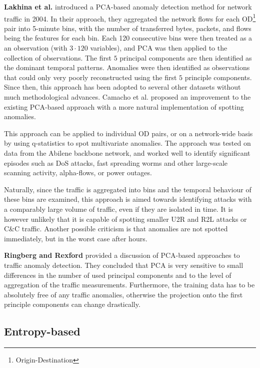 \documentclass[a4paper,12pt,twoside]{report}
\begin{document}
\textbf{Lakhina et al.} \cite{lakhina_diagnosing_2004,lakhina_characterization_2004}  introduced a PCA-based anomaly detection method for network traffic in 2004. In their approach, they aggregated the network flows for each OD\footnote{Origin-Destination} pair into 5-minute bins, with the number of transferred bytes, packets, and flows being the features for each bin. Each 120 consecutive bins were then treated as a an observation (with $3\cdot 120$ variables), and PCA was then applied to the collection of observations. The first $5$ principal components are then identified as the dominant temporal patterns. Anomalies were then identified as observations that could only very poorly reconstructed using the first $5$ principle components. Since then, this approach has been adopted to several other datasets without much methodological advances. Camacho et al. \cite{camacho_pca-based_2016} proposed an improvement to the existing PCA-based approach with a more natural implementation of spotting anomalies. 

This approach can be applied to individual OD pairs, or on a network-wide basis by using q-statistics to spot multivariate anomalies. The approach was tested on data from the Abilene backbone network, and worked well to identify significant episodes such as DoS attacks, fast spreading worms and other large-scale scanning activity, alpha-flows, or power outages. 

Naturally, since the traffic is aggregated into bins and the temporal behaviour of these bins are examined, this approach is aimed towards identifying attacks with a comparably large volume of traffic, even if they are isolated in time. It is however unlikely that it is capable of spotting smaller U2R and R2L attacks or C\&C traffic. Another possible criticism is that anomalies are not spotted immediately, but in the worst case after hours.


\textbf{Ringberg and Rexford} \cite{ringberg_sensitivity_2007} provided a discussion of PCA-based approaches to traffic anomaly detection. They concluded that PCA is very sensitive to small differences in the number of used principal components and to the level of aggregation of the traffic measurements. Furthermore, the training data has to be absolutely free of any traffic anomalies, otherwise the projection onto the first principle components can change drastically. 

\subsection{Entropy-based}
\end{document}
